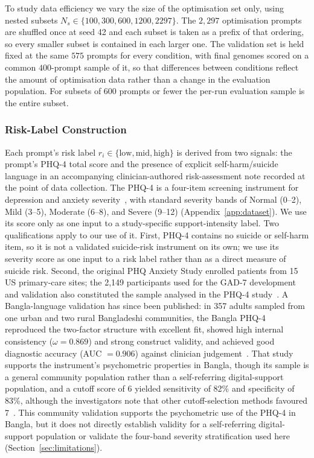 \documentclass[mathematics,article,submit,xetex,moreauthors]{Definitions/mdpi}
\begin{document}
To study data efficiency we vary the size of the optimisation set only, using
nested subsets $N_s \in \{100, 300, 600, 1200, 2297\}$. The $2{,}297$
optimisation prompts are shuffled once at seed 42 and each subset is taken as
a prefix of that ordering, so every smaller subset is contained in each larger
one. The validation set is held fixed at the same $575$ prompts for every
condition, with final genomes scored on a common $400$-prompt sample of it, so
that differences between conditions reflect the amount of optimisation data
rather than a change in the evaluation population. For subsets of $600$
prompts or fewer the per-run evaluation sample is the entire subset.

\subsubsection{Risk-Label Construction}
\label{sec:risk-labels}

Each prompt's risk label $r_i \in \{\mathrm{low}, \mathrm{mid}, \mathrm{high}\}$
is derived from two signals: the prompt's PHQ-4 total score and the presence
of explicit self-harm/suicide language in an accompanying clinician-authored
risk-assessment note recorded at the point of data collection. The PHQ-4 is
a four-item screening instrument for depression and anxiety
severity~\cite{phq4}, with standard severity bands of Normal (0--2), Mild
(3--5), Moderate (6--8), and Severe (9--12) (Appendix~\ref{app:dataset}). We use its score only as one input to a study-specific support-intensity label.
Two qualifications apply to our use of it. First, PHQ-4 contains no suicide
or self-harm item, so it is not a validated suicide-risk instrument on its
own; we use its severity score as one input to a risk label rather than as
a direct measure of suicide risk. Second, the original PHQ Anxiety Study enrolled patients from 15 US primary-care sites;
the 2,149 participants used for the GAD-7 development and validation also
constituted the sample analysed in the PHQ-4 study~\cite{phq4}. A Bangla-language
validation has since been published: in 357 adults sampled from one urban
and two rural Bangladeshi communities, the Bangla PHQ-4 reproduced the
two-factor structure with excellent fit, showed high internal consistency
($\omega = 0.869$) and strong construct validity, and achieved good
diagnostic accuracy (AUC $= 0.906$) against clinician
judgement~\cite{banglaphq4_2026}. That study supports the instrument's
psychometric properties in Bangla, though its sample is a general community
population rather than a self-referring digital-support population, and a cutoff score of 6 yielded sensitivity
of 82\% and specificity of 83\%, although the investigators note that other
cutoff-selection methods favoured 7~\cite{banglaphq4_2026}. This community
validation supports the psychometric use of the PHQ-4 in Bangla, but it does
not directly establish validity for a self-referring digital-support population
or validate the four-band severity stratification used here
(Section~\ref{sec:limitations}).
\end{document}
